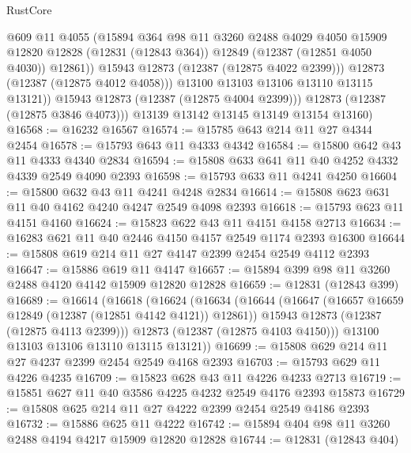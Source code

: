\begin{lexlean}{RustCore}
\begin{coremodule}
                    @609
                    @11
                    @4055
                    (@15894
                      @364
                      @98
                      @11
                      @3260
                      @2488
                      @4029
                      @4050
                      @15909
                      @12820
                      @12828
                      (@12831 (@12843 @364))
                      @12849
                      (@12387 (@12851 @4050 @4030))
                      @12861))
                  @15943
                  @12873
                  (@12387 (@12875 @4022 @2399)))
                @12873
                (@12387 (@12875 @4012 @4058)))
              @13100
              @13103
              @13106
              @13110
              @13115
              @13121))
          @15943
          @12873
          (@12387 (@12875 @4004 @2399)))
        @12873
        (@12387 (@12875 @3846 @4073)))
      @13139
      @13142
      @13145
      @13149
      @13154
      @13160)
@16568 := @16232 @16567
@16574 := @15785 @643 @214 @11 @27 @4344 @2454
@16578 := @15793 @643 @11 @4333 @4342
@16584 := @15800 @642 @43 @11 @4333 @4340 @2834
@16594 := @15808 @633 @641 @11 @40 @4252 @4332 @4339 @2549 @4090 @2393
@16598 := @15793 @633 @11 @4241 @4250
@16604 := @15800 @632 @43 @11 @4241 @4248 @2834
@16614 := @15808 @623 @631 @11 @40 @4162 @4240 @4247 @2549 @4098 @2393
@16618 := @15793 @623 @11 @4151 @4160
@16624 := @15823 @622 @43 @11 @4151 @4158 @2713
@16634 := @16283 @621 @11 @40 @2446 @4150 @4157 @2549 @1174 @2393 @16300
@16644 := @15808 @619 @214 @11 @27 @4147 @2399 @2454 @2549 @4112 @2393
@16647 := @15886 @619 @11 @4147
@16657 := @15894 @399 @98 @11 @3260 @2488 @4120 @4142 @15909 @12820 @12828
@16659 := @12831 (@12843 @399)
@16689 := @16614
    (@16618
      (@16624
        (@16634
          (@16644
            (@16647 (@16657 @16659 @12849 (@12387 (@12851 @4142 @4121)) @12861))
            @15943
            @12873
            (@12387 (@12875 @4113 @2399)))
          @12873
          (@12387 (@12875 @4103 @4150)))
        @13100
        @13103
        @13106
        @13110
        @13115
        @13121))
@16699 := @15808 @629 @214 @11 @27 @4237 @2399 @2454 @2549 @4168 @2393
@16703 := @15793 @629 @11 @4226 @4235
@16709 := @15823 @628 @43 @11 @4226 @4233 @2713
@16719 := @15851 @627 @11 @40 @3586 @4225 @4232 @2549 @4176 @2393 @15873
@16729 := @15808 @625 @214 @11 @27 @4222 @2399 @2454 @2549 @4186 @2393
@16732 := @15886 @625 @11 @4222
@16742 := @15894 @404 @98 @11 @3260 @2488 @4194 @4217 @15909 @12820 @12828
@16744 := @12831 (@12843 @404)

\end{coremodule}
\end{lexlean}
